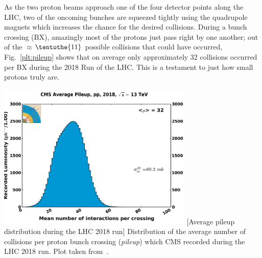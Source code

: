 As the two proton beams approach one of the four detector points along the LHC, two of the oncoming bunches are squeezed tightly using the quadrupole magnets which increases the chance for the desired \pp collisions.
During a bunch crossing (BX), amazingly most of the protons just pass right by one another; 
out of the $\approx$$\tentothe{11}$ possible \pp collisions that could have occurred, Fig.~\ref{plt:pileup} shows that on average only approximately 32 collisions occurred per BX during the 2018 Run of the LHC. %
This is a testament to just how small protons truly are.
\begin{multiFigure}
    \centering
    \includegraphics[width=0.7\textwidth,keepaspectratio]{figures/lhc/pileup_pp_2018.png}
        [Average pileup distribution during the LHC 2018 run]
        {Distribution of the average number of \pp collisions per proton bunch crossing (\emph{pileup}) which CMS recorded during the LHC 2018 run.
        Plot taken from~\cite{PhysRevLett.114.191803}. %
        } 
    \label{plt:pileup}
\end{multiFigure}

